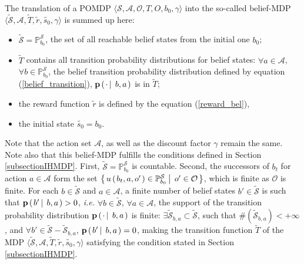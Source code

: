 The translation of a POMDP $\langle \mathcal{S}, \mathcal{A}, \mathcal{O}, T, O, b_0, \gamma \rangle$ 
into the so-called belief-MDP $\langle \tilde{\mathcal{S}}, \mathcal{A}, \tilde{T}, \tilde{r}, \tilde{s_0}, \gamma \rangle$ 
is summed up here: 
\begin{itemize}
\item $\tilde{\mathcal{S}} = \mathbb{P}_{b_0}^{\mathcal{S}}$, the set of all reachable belief states from the initial one $b_0$;
\item $\tilde{T}$ contains all transition probability distributions
for belief states: $\forall a \in \mathcal{A}$, $\forall b \in  \mathbb{P}_{b_0}^{\mathcal{S}}$, 
the belief transition probability distribution defined by equation (\ref{belief_transition}),
$\textbf{p} \left( \left.  \cdot \, \right| \left. \, b, a  \right. \right)$ is in $\tilde{T}$; 
\item the reward function $\tilde{r}$ is defined by the equation (\ref{reward_bel}),
\item the initial state $\tilde{s_0} = b_0$.
\end{itemize}
Note that the action set $\mathcal{A}$, as well as the discount factor $\gamma$
remain the same.
Note also that this belief-MDP fulfills the conditions 
defined in Section \ref{subsectionIHMDP}.
First, $\tilde{\mathcal{S}} = \mathbb{P}^{\mathcal{S}}_{b_0}$ is countable.
Second, the successors of $b_t$ for action $a \in \mathcal{A}$ 
form the set $\left\{ \left.  u \left( \left.  b_t,a,o' \right. \right) \in \mathbb{P}^{\mathcal{S}}_{b_0} \, \right| \left. \, o' \in \mathcal{O}  \right. \right\}$,
which is finite as $\mathcal{O}$ is finite.
For each $b \in \tilde{\mathcal{S}}$
and $a \in \mathcal{A}$,
a finite number of belief states $b' \in \tilde{\mathcal{S}}$ 
is such that $\textbf{p} \left( \left.  b' \, \right| \left. \, b, a  \right. \right)>0$,
\textit{i.e.} $\forall b \in \tilde{\mathcal{S}}$, 
$\forall a \in \mathcal{A}$, 
the support of the transition probability distribution  
$\mathbf{p} \left( \left.  \cdot \, \right| \left. \, b,a  \right. \right)$ is finite: 
$\exists \tilde{\mathcal{S}}_{b,a} \subset \tilde{\mathcal{S}}$, such that
$\# (\tilde{\mathcal{S}}_{b,a})< +\infty$, 
and $\forall b' \in \tilde{\mathcal{S}} - \tilde{\mathcal{S}}_{b,a}$, 
$\textbf{p} \left( \left.  b' \, \right| \left. \, b,a \right. \right)=0$,
making the transition function $\tilde{T}$ 
of the MDP $\langle \tilde{\mathcal{S}}, \mathcal{A}, \tilde{T}, \tilde{r}, \tilde{s_0}, \gamma \rangle$
satisfying the condition stated in Section \ref{subsectionIHMDP}.

